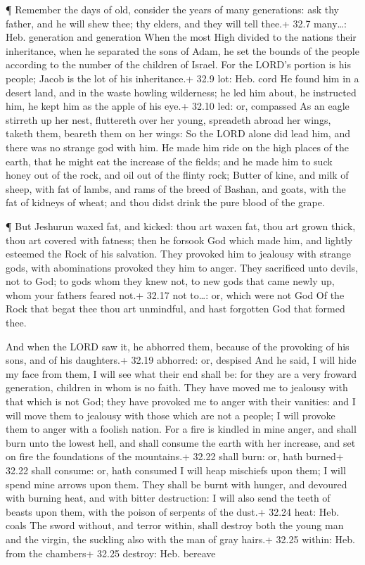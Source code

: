  ¶ Remember the days of old, consider the years of many
generations: ask thy father, and he will shew thee; thy elders, and they
will tell thee.+ 32.7 many\ldots: Heb. generation and generation
 When the most High divided to the nations their
inheritance, when he separated the sons of Adam, he set the bounds of
the people according to the number of the children of Israel.
 For the LORD's portion is his people; Jacob is the lot of
his inheritance.+ 32.9 lot: Heb. cord  He found him in a
desert land, and in the waste howling wilderness; he led him about, he
instructed him, he kept him as the apple of his eye.+ 32.10 led: or,
compassed  As an eagle stirreth up her nest, fluttereth
over her young, spreadeth abroad her wings, taketh them, beareth them on
her wings:  So the LORD alone did lead him, and there was
no strange god with him.  He made him ride on the high
places of the earth, that he might eat the increase of the fields; and
he made him to suck honey out of the rock, and oil out of the flinty
rock;  Butter of kine, and milk of sheep, with fat of
lambs, and rams of the breed of Bashan, and goats, with the fat of
kidneys of wheat; and thou didst drink the pure blood of the grape.

 ¶ But Jeshurun waxed fat, and kicked: thou art waxen fat,
thou art grown thick, thou art covered with fatness; then he forsook God
which made him, and lightly esteemed the Rock of his salvation.
 They provoked him to jealousy with strange gods, with
abominations provoked they him to anger.  They sacrificed
unto devils, not to God; to gods whom they knew not, to new gods that
came newly up, whom your fathers feared not.+ 32.17 not to\ldots: or,
which were not God  Of the Rock that begat thee thou art
unmindful, and hast forgotten God that formed thee.

 And when the LORD saw it, he abhorred them, because of the
provoking of his sons, and of his daughters.+ 32.19 abhorred: or,
despised  And he said, I will hide my face from them, I
will see what their end shall be: for they are a very froward
generation, children in whom is no faith.  They have moved
me to jealousy with that which is not God; they have provoked me to
anger with their vanities: and I will move them to jealousy with those
which are not a people; I will provoke them to anger with a foolish
nation.  For a fire is kindled in mine anger, and shall
burn unto the lowest hell, and shall consume the earth with her
increase, and set on fire the foundations of the mountains.+ 32.22 shall
burn: or, hath burned+ 32.22 shall consume: or, hath consumed
 I will heap mischiefs upon them; I will spend mine arrows
upon them.  They shall be burnt with hunger, and devoured
with burning heat, and with bitter destruction: I will also send the
teeth of beasts upon them, with the poison of serpents of the dust.+
32.24 heat: Heb. coals  The sword without, and terror
within, shall destroy both the young man and the virgin, the suckling
also with the man of gray hairs.+ 32.25 within: Heb. from the chambers+
32.25 destroy: Heb. bereave

